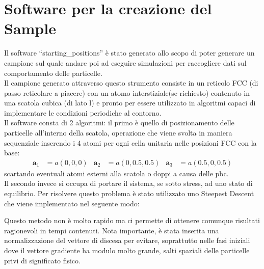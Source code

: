 \documentclass[a4paper,11pt]{article}
\begin{document}
	\section{Software per la creazione del Sample} %
	\label{sec:software_per_la_creazione_del_sample}
		Il software ``starting\_positions'' è stato generato allo scopo di poter 
		generare un campione sul quale andare poi ad eseguire simulazioni per
		raccogliere dati sul comportamento delle particelle.\\
		Il campione generato attraverso questo strumento consiste in un reticolo
		FCC (di passo reticolare a piacere) con un atomo interstiziale(se 
		richiesto) contenuto in una scatola cubica (di lato l) e pronto per
		essere utilizzato in algoritmi capaci di implementare le condizioni 
		periodiche al contorno.\\
		Il software consta di 2 algoritmi: il primo è quello di posizionamento 
		delle particelle all'interno della scatola, operazione che viene svolta
		in maniera sequenziale inserendo i 4 atomi per ogni cella unitaria nelle 
		posizioni FCC con la base:
		\begin{align}
			\mathbf a_1  &= a(0,0,0) & 
			\mathbf a_2  &= a(0,0.5,0.5) &
			\mathbf a_3  &= a(0.5,0,0.5) 
		\end{align}
		scartando eventuali atomi esterni alla scatola o doppi a causa delle pbc.\\
		Il secondo invece si occupa di portare il sistema, se sotto stress, ad uno 
		stato di equilibrio. Per risolvere questo problema è stato utilizzato uno 
		Steepest Descent che viene implementato nel seguente modo:
		\begin{center}
	    \end{center}
	    Questo metodo non è molto rapido ma ci permette di ottenere comunque
	    risultati ragionevoli in tempi contenuti.
	    Nota importante, è stata inserita una normalizzazione del vettore di discesa
	    per evitare, soprattutto nelle fasi iniziali dove il vettore gradiente ha 
	    modulo molto grande, salti spaziali delle particelle privi di significato fisico.
\end{document}
